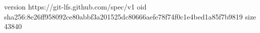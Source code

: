 version https://git-lfs.github.com/spec/v1
oid sha256:8e26ff958092ce80abbf3a201525dc80666aefe78f74f0c1e4bed1a85f7b9819
size 43840
